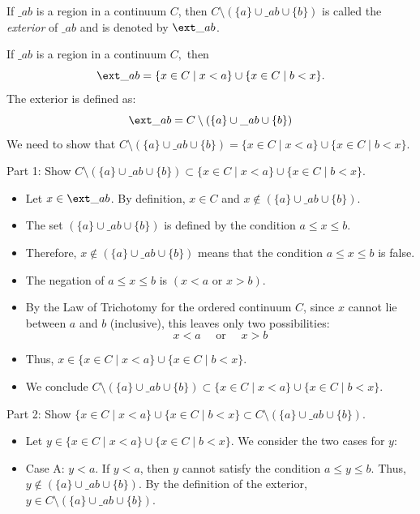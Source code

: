 \documentclass[11pt]{article}
\begin{document}
\begin{definition} If $\_{ab}$ is a region in a continuum $C$, then $C \setminus (\{a\} \cup \_{ab} \cup \{b\})$ is called the \emph{exterior} of $\_{ab}$ and is denoted by $\ext\_{ab}$.
\end{definition}

\begin{lemma} If $\_{ab}$ is a region in a continuum $C,$ then$$\ext\_{ab}=\{x\in C\mid x<a\}\cup\{x\in C\mid b<x\}.$$
    The exterior is defined as:
    \[
    \ext\_{ab} = C \setminus (\{a\} \cup \_{ab}\cup \{b\})
    \]
    We need to show that $C \setminus (\{a\} \cup \_{ab}\cup \{b\}) = \{x \in C \mid x < a\} \cup \{x \in C \mid b < x\}$.
    
    Part 1: Show $C \setminus (\{a\} \cup \_{ab}\cup \{b\}) \subset \{x \in C \mid x < a\} \cup \{x \in C \mid b < x\}$.
    \begin{itemize}
        \item Let $x \in \ext\_{ab}$. By definition, $x \in C$ and $x \notin (\{a\} \cup \_{ab}\cup \{b\})$.
        \item The set $(\{a\} \cup \_{ab}\cup \{b\})$ is defined by the condition $a \le x \le b$.
        \item Therefore, $x \notin (\{a\} \cup \_{ab}\cup \{b\})$ means that the condition $a \le x \le b$ is false.
        \item The negation of $a \le x \le b$ is $(x < a \text{ or } x > b)$.
        \item By the Law of Trichotomy for the ordered continuum $C$, since $x$ cannot lie between $a$ and $b$ (inclusive), this leaves only two possibilities:
        \[
        x < a \quad \text{ or } \quad x > b
        \]
        \item Thus, $x \in \{x \in C \mid x < a\} \cup \{x \in C \mid b < x\}$.
        \item We conclude $C \setminus (\{a\} \cup \_{ab}\cup \{b\}) \subset \{x \in C \mid x < a\} \cup \{x \in C \mid b < x\}$.
    \end{itemize}

    Part 2: Show $\{x \in C \mid x < a\} \cup \{x \in C \mid b < x\} \subset C \setminus (\{a\} \cup \_{ab}\cup \{b\})$.
    \begin{itemize}
        \item Let $y \in \{x \in C \mid x < a\} \cup \{x \in C \mid b < x\}$. We consider the two cases for $y$:
        
        \item Case A: $y < a$.
        If $y < a$, then $y$ cannot satisfy the condition $a \le y \le b$. Thus, $y \notin (\{a\} \cup \_{ab}\cup \{b\})$. By the definition of the exterior, $y \in C \setminus (\{a\} \cup \_{ab}\cup \{b\})$.
        

\end{itemize}
\end{lemma}
\end{document}
